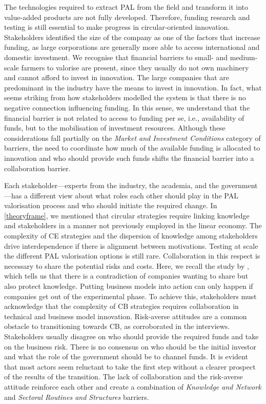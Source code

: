 The technologies required to extract PAL from the field and transform it into value-added products are not fully developed. Therefore, funding research and testing is still essential to make progress in circular-oriented innovation. Stakeholders identified the size of the company as one of the factors that increase funding, as large corporations are generally more able to access international and domestic investment. We recognise that financial barriers to small- and medium-scale farmers to valorise are present, since they usually do not own machinery and cannot afford to invest in innovation. The large companies that are predominant in the industry have the means to invest in innovation. In fact, what seems striking from how stakeholders modelled the system is that there is no negative connection influencing funding. In this sense, we understand that the financial barrier is not related to access to funding per se, i.e., availability of funds, but to the mobilisation of investment resources. Although these considerations fall partially on the \textit{Market and Investment Conditions} category of barriers, the need to coordinate how much of the available funding is allocated to innovation and who should provide such funds shifts the financial barrier into a collaboration barrier. 

Each stakeholder---experts from the industry, the academia, and the government---has a different view about what roles each other should play in the PAL valorisation process and who should initiate the required change. In \cref{theoryframe}, we mentioned that circular strategies require linking knowledge and stakeholders in a manner not previously employed in the linear economy. The complexity of CE strategies and the dispersion of knowledge among stakeholders drive interdependence if there is alignment between motivations. Testing at scale the different PAL valorisation options is still rare. Collaboration in this respect is necessary to share the potential risks and costs. Here, we recall the study by \cite{brown2019companies}, which tells us that there is a contradiction of companies wanting to share but also protect knowledge. Putting business models into action can only happen if companies get out of the experimental phase. To achieve this, stakeholders must acknowledge that the complexity of CB strategies requires collaboration in technical and business model innovation. Risk-averse attitudes are a common obstacle to transitioning towards CB, as corroborated in the interviews. Stakeholders usually disagree on who should provide the required funds and take on the business risk. There is no consensus on who should be the initial investor and what the role of the government should be to channel funds. It is evident that most actors seem reluctant to take the first step without a clearer prospect of the results of the transition. The lack of collaboration and the risk-averse attitude reinforce each other and create a combination of \textit{Knowledge and Network} and \textit{Sectoral Routines and Structures} barriers.

